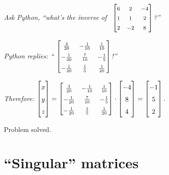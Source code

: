 \begin{center}
\textit{Ask Python, ``what's the inverse of \
${\footnotesize \begin{bmatrix}
6 & 2 & -4 \\
1 & 1 & 2 \\
2 & -2 & 8 \\
\end{bmatrix}}$?''
}

\textit{Python replies: ``
${\small
\begingroup
\renewcommand*{\arraystretch}{1.5}
\begin{bmatrix}
\frac{3}{20} & -\frac{1}{10} & \frac{1}{10} \\
-\frac{1}{20} & \frac{7}{10} & -\frac{1}{5} \\
-\frac{1}{20} & \frac{1}{5} & \frac{1}{20} \\
\end{bmatrix}
\endgroup}$!''
}

\smallskip
\textit{Therefore: }
$\begin{bmatrix}
x \\ y \\ z \\
\end{bmatrix} =
{\small
\begingroup
\renewcommand*{\arraystretch}{1.5}
\begin{bmatrix}
\frac{3}{20} & -\frac{1}{10} & \frac{1}{10} \\
-\frac{1}{20} & \frac{7}{10} & -\frac{1}{5} \\
-\frac{1}{20} & \frac{1}{5} & \frac{1}{20} \\
\end{bmatrix}
\endgroup} \cdot
\begin{bmatrix}
-4 \\ 8 \\ 4 \\
\end{bmatrix} =
\begin{bmatrix}
-1 \\ 5 \\ 2 \\
\end{bmatrix}.$
\end{center}

Problem solved.

\section{``Singular'' matrices}


